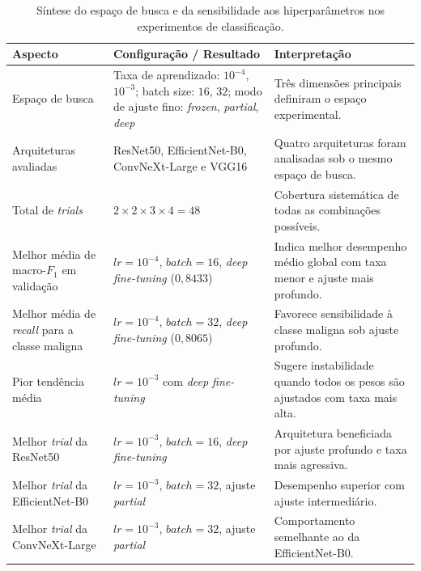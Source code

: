 \documentclass[tcc,capa]{texufpel}
\begin{document}
\begin{table}[htbp]
	\centering
	\caption{Síntese do espaço de busca e da sensibilidade aos hiperparâmetros nos experimentos de classificação.}
	\label{tab:hyperparameter_sensitivity_summary}
	\begin{tabular}{p{4.2cm} p{5.2cm} p{5.2cm}}
		\toprule
		\textbf{Aspecto} & \textbf{Configuração / Resultado} & \textbf{Interpretação} \\ 
		\midrule
		Espaço de busca & 
		Taxa de aprendizado: \(10^{-4}\), \(10^{-3}\); 
		batch size: \(16\), \(32\); 
		modo de ajuste fino: \textit{frozen}, \textit{partial}, \textit{deep} &
		Três dimensões principais definiram o espaço experimental. \\
		
		Arquiteturas avaliadas & 
		ResNet50, EfficientNet-B0, ConvNeXt-Large e VGG16 &
		Quatro arquiteturas foram analisadas sob o mesmo espaço de busca. \\
		
		Total de \textit{trials} & 
		\(2 \times 2 \times 3 \times 4 = 48\) &
		Cobertura sistemática de todas as combinações possíveis. \\
		
		Melhor média de macro-\(F_1\) em validação & 
		\(lr = 10^{-4}\), \(batch = 16\), \textit{deep fine-tuning} 
		(\(0{,}8433\)) &
		Indica melhor desempenho médio global com taxa menor e ajuste mais profundo. \\
		
		Melhor média de \textit{recall} para a classe maligna & 
		\(lr = 10^{-4}\), \(batch = 32\), \textit{deep fine-tuning} 
		(\(0{,}8065\)) &
		Favorece sensibilidade à classe maligna sob ajuste profundo. \\
		
		Pior tendência média & 
		\(lr = 10^{-3}\) com \textit{deep fine-tuning} &
		Sugere instabilidade quando todos os pesos são ajustados com taxa mais alta. \\
		
		Melhor \textit{trial} da ResNet50 & 
		\(lr = 10^{-3}\), \(batch = 16\), \textit{deep fine-tuning} &
		Arquitetura beneficiada por ajuste profundo e taxa mais agressiva. \\
		
		Melhor \textit{trial} da EfficientNet-B0 & 
		\(lr = 10^{-3}\), \(batch = 32\), ajuste \textit{partial} &
		Desempenho superior com ajuste intermediário. \\
		
		Melhor \textit{trial} da ConvNeXt-Large & 
		\(lr = 10^{-3}\), \(batch = 32\), ajuste \textit{partial} &
		Comportamento semelhante ao da EfficientNet-B0. \\
		

\end{tabular}
\end{table}
\end{document}
